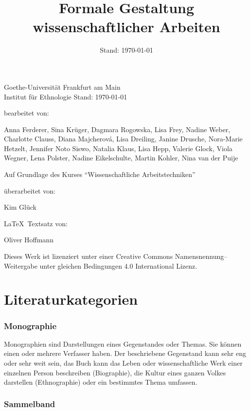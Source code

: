 \documentclass[ 12pt,
                titlepage,
                parskip=half,
                version=first,
                bibliography=totocnumbered,
                final,
                listof=totoc]{scrartcl}
\title{Formale Gestaltung wissenschaftlicher Arbeiten}
\date{Stand: \today}
\begin{document}
\maketitle

Goethe-Universität Frankfurt am Main\\
Institut für Ethnologie
\vfill
Stand: \today

bearbeitet von:

Anna Ferderer, Sina Krüger, Dagmara Rogowska, Lisa Frey, Nadine Weber, Charlotte
Clauss, Diana Majcherová, Lisa Dreiling, Janine Drusche, Nora-Marie Hetzelt,
Jennifer Noto Siswo, Natalia Klaus, Lisa Hepp, Valerie Glock, Viola Wegner, Lena
Polster, Nadine Eikelschulte, Martin Kohler, Nina van der Puije

Auf Grundlage des Kurses \enquote{Wissenschaftliche Arbeitstechniken}

überarbeitet von:

Kim Glück

\LaTeX~Textsatz von:

Oliver Hoffmann
\vfill
\begin{center}
\ccbysa

Dieses Werk ist lizenziert unter einer Creative Commons Namensnennung--Weitergabe unter gleichen Bedingungen 4.0 International Lizenz.
\end{center}

\newpage
{}
\tableofcontents
{}
\newpage

\section{Literaturkategorien}
\label{sec:literaturkategorien}

\subsubsection*{Monographie}

Monographien sind Darstellungen eines Gegenstandes oder Themas. Sie können einen
oder mehrere Verfasser haben. Der beschriebene Gegenstand kann sehr eng oder
sehr weit sein, das Buch kann das Leben oder wissenschaftliche Werk einer
einzelnen Person beschreiben (Biographie), die Kultur eines ganzen Volkes
darstellen (Ethnographie) oder ein bestimmtes Thema umfassen.

\subsubsection*{Sammelband}
\end{document}
